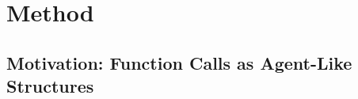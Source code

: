 \documentclass{article}
\begin{document}
\section{Method}
\label{sec:method}


%
%
\subsection{Motivation: Function Calls as Agent-Like Structures}
\label{sec:method:motivation}



%
%
%
\end{document}

